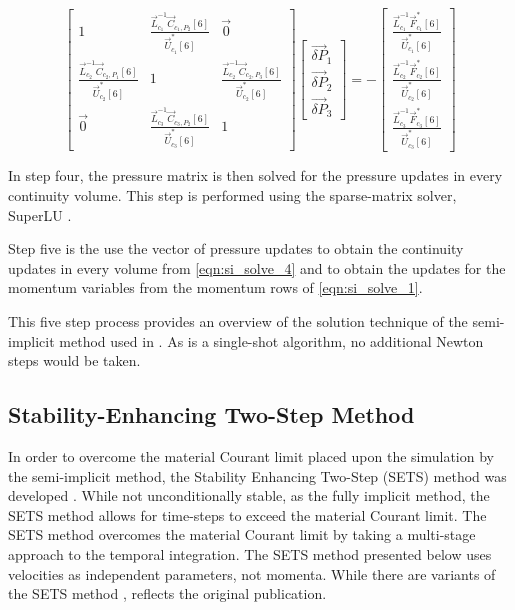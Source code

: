   \begin{equation}
 \label{eqn:si_pressure_matrix}
 \begin{bmatrix} 
 1 & \frac{\vec{L}^{-1}_{c_1}\vec{C}_{c_1,P_2}[6]}{\vec{U}^{*}_{c_1}[6]} & \vec{0} \\
 \frac{\vec{L}^{-1}_{c_2}\vec{C}_{c_2,P_1}[6]}{\vec{U}^{*}_{c_2}[6]} & 1 & \frac{\vec{L}^{-1}_{c_2}\vec{C}_{c_2,P_3}[6]}{\vec{U}^{*}_{c_2}[6]} \\
 \vec{0}           & \frac{\vec{L}^{-1}_{c_3}\vec{C}_{c_3,P_2}[6]}{\vec{U}^{*}_{c_3}[6]} & 1
 \end{bmatrix} \begin{bmatrix}
 \vec{\delta P}_{1} \\
 \vec{\delta P}_{2} \\
 \vec{\delta P}_{3}
\end{bmatrix}  = -\begin{bmatrix}
 \frac{\vec{L}^{-1}_{c_1}\vec{F}^{*}_{c_1}[6]}{\vec{U}^{*}_{c_1}[6]} \\
 \frac{\vec{L}^{-1}_{c_2}\vec{F}^{*}_{c_2}[6]}{\vec{U}^{*}_{c_2}[6]} \\
 \frac{\vec{L}^{-1}_{c_3}\vec{F}^{*}_{c_3}[6]}{\vec{U}^{*}_{c_3}[6]}
\end{bmatrix}
 \end{equation}

In step four, the pressure matrix is then solved for the pressure updates in every continuity volume.
This step is performed using the sparse-matrix solver, SuperLU \cite{Li1999}. 

Step five is the use the vector of pressure updates to obtain the continuity updates in every volume from \eqref{eqn:si_solve_4} and to obtain the updates for the momentum variables from the momentum rows of \eqref{eqn:si_solve_1}.

This five step process provides an overview of the solution technique of the semi-implicit method used in \cobra{}.
As \cobra{} is a single-shot algorithm, no additional Newton steps would be taken.

\subsection{Stability-Enhancing Two-Step Method} 
\label{subsect:numerics_sets}
In order to overcome the material Courant limit placed upon the simulation by the semi-implicit method, the Stability Enhancing Two-Step (SETS) method was developed \cite{Mahaffy1982}.
While not unconditionally stable, as the fully implicit method, the SETS method allows for time-steps to exceed the material Courant limit.
The SETS method overcomes the material Courant limit by taking a multi-stage approach to the temporal integration.
The SETS method presented below uses velocities as independent parameters, not momenta.
While there are variants of the SETS method \cite{TRACE},  reflects the original publication.

